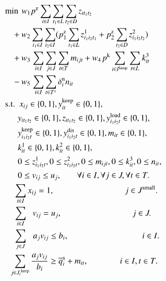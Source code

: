 \documentclass[a4j,11pt,twocolumn]{jsarticle}
\begin{document}
\begin{align}
  &\textrm{min} \hspace{0.4em} {w_1 p^{\rm{z}} \sum_{i \in I} \sum_{t_1 \in L}  \sum_{t_2 \in D} {z_{it_1t_2}}} \notag \\
&\hspace{0.85em} + {w_2 \sum_{i_1 \in I} \sum_{i_2 \in I} (p_1^{\rm{z}} \sum_{t_1 \in L} {z_{i_1i_2t_1}^1} + p_2^{\rm{z}} \sum_{t_2 \in D} {z_{i_1i_2t_2}^2} )} \notag \\
&\hspace{0.85em} + {w_3 \hspace{0.1em} \sum_{i \in I} \sum_{j\in J} \sum_{t \in T}  {m_{ijt}} }
+ {w_4 \hspace{0.1em} p^{\rm{k}} \sum_{i \in I^{\rm{lamp}}} \sum_{t \in L} {k_{it}^3}} \notag \\
&\hspace{0.85em} - {w_5 \hspace{0.1em} \sum_{i \in I} \sum_{t \in T^{\rm{c}}} \delta_i^{\rm{n}} {n_{it}}}  \\ %
&\textrm{s.t.} \hspace{0.5em} x_{ij} \in \{ 0 , 1 \}, {y_{it}^{\rm{keep}}} \in \{ 0 , 1 \}, \notag \\
&\hspace{1.5em}  {y_{it_1t_2}} \in \{ 0 , 1 \}, z_{it_1t_2} \in \{ 0 , 1 \},  {y_{i_1i_2t}^{\rm{load}}} \in \{ 0 , 1 \}, \notag \\
&\hspace{1.5em}  {y_{i_1i_2t}^{\rm{keep}}} \in \{ 0 , 1 \}, {y_{i_1i_2t}^{\rm{dis}}} \in \{ 0 , 1 \}, {m_{it}} \in \{ 0 , 1 \}, \notag \\
&\hspace{1.5em}{k^1_{it}} \in \{ 0 , 1 \}, {k^2_{it}} \in \{ 0 , 1 \}, \notag \\
&\hspace{1.5em} 0 \leq z_{i_1i_2t}^1, 0 \leq z_{i_1i_2t}^2, 0 \leq m_{ijt}, 0 \leq k^3_{it}, 0 \leq n_{it}, \notag \\
&\hspace{1.5em} 0 \leq v_{ij} \leq u_j, \hspace{1.85em} \forall i \in I, \forall j \in J, \forall t \in T. \\
&\hspace{1.0em} \sum_{i \in I} x_{ij} = 1, \hspace{8.34em} j \in J^{\rm{small}}. \\
&\hspace{1.0em} \sum_{i \in I} {\hspace{0.6em}v_{ij}} = u_j, \hspace{8.33em} j \in J. \\
&\hspace{1.0em} \sum_{j \in J} {\hspace{0.65em}a_{j}}{v_{ij}} \leq {b_{i}}, \hspace{8.7em} i \in I. \\
&\hspace{0.5em} \sum_{j \in {J_t}^{\rm{keep}}} \frac{a_{j} v_{ij}} {b_{i}} \geq \overline{q}_{i}^{\rm{s}} + {m_{it}}, \hspace{3.76em} i \in I, t \in T.
\end{align}
\end{document}
